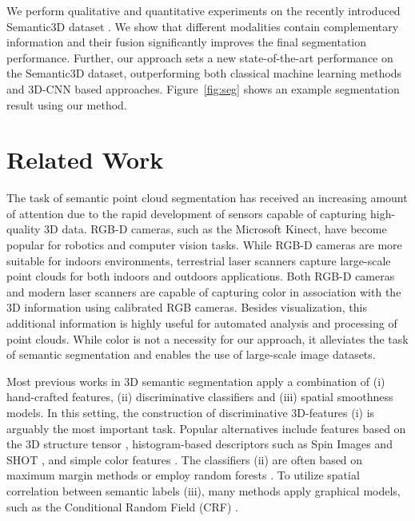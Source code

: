 \documentclass[runningheads,a4paper]{llncs}
\begin{document}
We perform qualitative and quantitative experiments on the recently introduced Semantic3D dataset \cite{hackel2017semantic3d}. We show that different modalities contain complementary information and their fusion significantly improves the final segmentation performance. Further, our approach sets a new state-of-the-art performance on the Semantic3D dataset, outperforming both classical machine learning methods and 3D-CNN based approaches. Figure~\ref{fig:seg} shows an example segmentation result using our method. 





\section{Related Work}

The task of semantic point cloud segmentation has received an increasing amount of attention due to the rapid development of sensors capable of capturing high-quality 3D data. RGB-D cameras, such as the Microsoft Kinect, have become popular for robotics and computer vision tasks. While RGB-D cameras are more suitable for indoors environments, terrestrial  laser scanners capture large-scale point clouds for both indoors and outdoors applications. Both RGB-D cameras and modern laser scanners are capable of capturing color in association with the 3D information using calibrated RGB cameras. Besides visualization, this additional information is highly useful for automated analysis and processing of point clouds. While color is not a necessity for our approach, it alleviates the task of semantic segmentation and enables the use of large-scale image datasets.

Most previous works \cite{AnguelovCVPR05,HackelISPRS16,KahlerICCV13,MartinovicICCV15,KimICCV13} in 3D semantic segmentation apply a combination of (i) hand-crafted features, (ii) discriminative classifiers and (iii) spatial smoothness models. In this setting, the construction of discriminative 3D-features (i) is arguably the most important task. Popular alternatives include features based on the 3D structure tensor \cite{HackelISPRS16,WolfICRA15,KahlerICCV13,AnguelovCVPR05}, histogram-based descriptors \cite{HackelISPRS16,MartinovicICCV15,KahlerICCV13} such as Spin Images \cite{JohnsonPAMI99} and SHOT \cite{SaltiCVIU14}, and simple color features \cite{WolfICRA15,MartinovicICCV15,KahlerICCV13}. The classifiers (ii) are often based on maximum margin methods \cite{KimICCV13,AnguelovCVPR05} or employ random forests \cite{HackelISPRS16,KahlerICCV13,MartinovicICCV15}. To utilize spatial correlation between semantic labels (iii), many methods apply graphical models, such as the Conditional Random Field (CRF) \cite{WolfICRA15,AnguelovCVPR05,KimICCV13}.
\end{document}
